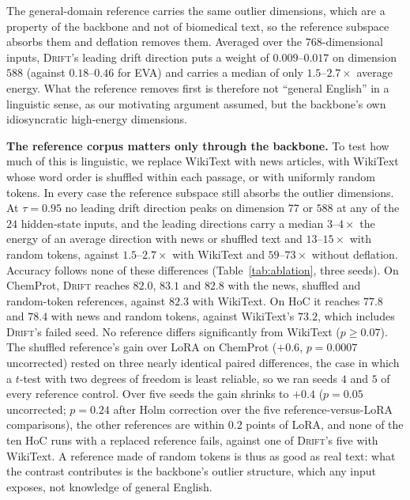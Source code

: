 \documentclass[conference,onecolumn]{IEEEtran}
\newcommand{\method}{\textsc{Drift}}
\begin{document}
The general-domain reference carries the same outlier dimensions, which are a
property of the backbone and not of biomedical text, so the reference subspace
absorbs them and deflation removes them. Averaged over the
$768$-dimensional inputs, \method{}'s leading drift direction puts a weight of
$0.009$--$0.017$ on dimension $588$ (against $0.18$--$0.46$ for EVA) and carries
a median of only $1.5$--$2.7\times$ average energy. What the reference removes
first is therefore not ``general English'' in a linguistic sense, as our
motivating argument assumed, but the backbone's own idiosyncratic high-energy
dimensions.

\noindent\textbf{The reference corpus matters only through the backbone.} To
test how much of this is linguistic, we replace WikiText with news articles,
with WikiText whose word order is shuffled within each passage, or with
uniformly random tokens. In every case the reference subspace still absorbs the
outlier dimensions. At $\tau = 0.95$ no leading drift direction peaks on
dimension $77$ or $588$ at any of the $24$ hidden-state inputs, and the leading
directions carry a median $3$--$4\times$ the energy of an average direction with
news or shuffled text and $13$--$15\times$ with random tokens, against
$1.5$--$2.7\times$ with WikiText and $59$--$73\times$ without deflation.
Accuracy follows none of these differences (Table~\ref{tab:ablation}, three
seeds). On ChemProt, \method{} reaches $82.0$, $83.1$ and $82.8$ with the news,
shuffled and random-token references, against $82.3$ with WikiText. On HoC it
reaches $77.8$ and $78.4$ with news and random tokens, against WikiText's
$73.2$, which includes \method{}'s failed seed. No reference differs
significantly from WikiText ($p \ge 0.07$). The shuffled reference's gain over
LoRA on ChemProt ($+0.6$, $p = 0.0007$ uncorrected) rested on three nearly
identical paired differences, the case in which a $t$-test with two degrees of
freedom is least reliable, so we ran seeds $4$ and $5$ of every reference
control. Over five seeds the gain shrinks to $+0.4$ ($p = 0.05$ uncorrected; $p
= 0.24$ after Holm correction over the five reference-versus-LoRA comparisons),
the other references are within $0.2$ points of LoRA, and none of the ten HoC
runs with a replaced reference fails, against one of \method{}'s five with
WikiText. A reference made of random tokens is thus as good as real text: what
the contrast contributes is the backbone's outlier structure, which any input
exposes, not knowledge of general English.
\end{document}
